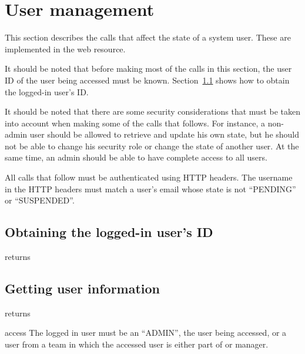 \section{User management}
\label{sec:call:user}

This section describes the calls that affect the state of a system user. These
are implemented in the
 web resource.

It should be noted that before making most of the calls in this section, the
user ID of the user being accessed must be known. Section~\ref{sec:user:crt}
shows how to obtain the logged-in user's ID.

It should be noted that there are some security considerations that must be
taken into account when making some of the calls that follows. For instance, a
non-admin user should be allowed to retrieve and update his own state, but he
should not be able to change his security role or change the state of another
user. At the same time, an admin should be able to have complete access to all
users.

All calls that follow must be authenticated using HTTP headers. The username in
the HTTP headers must match a user's email whose state is not ``PENDING'' or
``SUSPENDED''.


\subsection{Obtaining the logged-in user's ID}
\label{sec:user:crt}

\begin{apidata}{returns}
  \begin{datalist}
  \end{datalist}
\end{apidata}


\subsection{Getting user information}

\begin{apidata}{returns}
  \begin{datalist}
  \end{datalist}
\end{apidata}
\begin{apidata}{access}
The logged in user must be an ``ADMIN'', the user being accessed, or a user from
a team in which the accessed user is either part of or manager.
\end{apidata}


